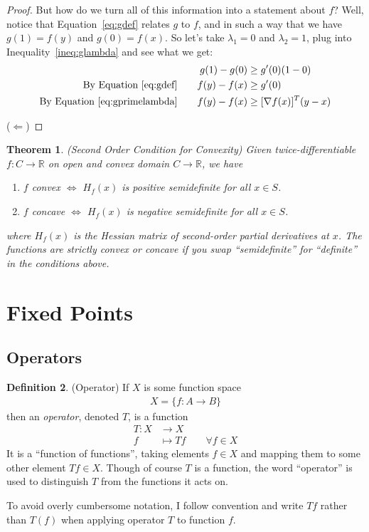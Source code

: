 \documentclass[12pt]{article}
\numberwithin{equation}{section} %
\theoremstyle{plain}
\newtheorem{thm}{Theorem}[section]
\theoremstyle{definition}
\newtheorem{defn}[thm]{Definition}
\theoremstyle{remark}
\newcommand{\R}{\mathbb{R}}
\begin{document}
\begin{proof}
But how do we turn all of this information into a statement about $f$?
Well, notice that Equation~\ref{eq:gdef} relates $g$ to $f$, and in such
a way that we have $g(1)=f(y)$ and $g(0)=f(x)$. So let's take
$\lambda_1=0$ and $\lambda_2=1$, plug into Inequality~\ref{ineq:glambda}
and see what we get:
\begin{align*}
  g(1) - g(0)
  &\geq g'(0)(1-0) \\
  \text{By Equation~\ref{eq:gdef}}\qquad
  f(y)-f(x)
  &\geq g'(0) \\
  \text{By Equation~\ref{eq:gprimelambda}}\qquad
  f(y)-f(x)
  &\geq [\nabla f(x)]^T (y-x) \\
\end{align*}

($\Leftarrow$)
\end{proof}

\begin{thm}{(Second Order Condition for Convexity)}
Given twice-differentiable $f:C\rightarrow\R$ on open and convex domain
$C\rightarrow\R$, we have
\begin{enumerate}
  \item $f$ convex $\iff$ $H_f(x)$ is positive semidefinite for all
    $x\in S$.
  \item $f$ concave $\iff$ $H_f(x)$ is negative semidefinite for all
    $x\in S$.
\end{enumerate}
where $H_f(x)$ is the Hessian matrix of second-order partial derivatives
at $x$. The functions are \emph{strictly} convex or concave if you
swap ``semidefinite'' for ``definite'' in the conditions above.
\end{thm}

\clearpage
\section{Fixed Points}

\subsection{Operators}

\begin{defn}{(Operator)}
If $X$ is some function space
\begin{align*}
  X = \{f:A\rightarrow B\}
\end{align*}
then an \emph{operator}, denoted $T$, is a function
\begin{align*}
  T:X&\rightarrow X \\
  f&\mapsto Tf
  \qquad \forall f\in X
\end{align*}
It is a ``function of functions'', taking elements $f\in X$ and mapping
them to some other element $Tf\in X$. Though of course $T$ is a
function, the word ``operator'' is used to distinguish $T$ from the
functions it acts on.

To avoid overly cumbersome notation, I follow convention and write $Tf$
rather than $T(f)$ when applying operator $T$ to function $f$.
\end{defn}
\end{document}
